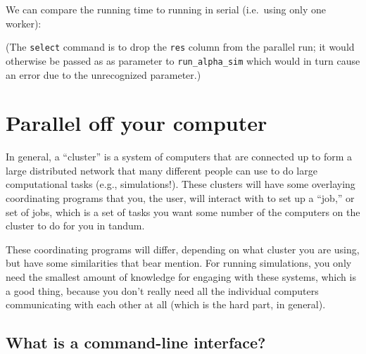 \documentclass[
]{book}
\newenvironment{Shaded}{\begin{snugshade}}{\end{snugshade}}
\newcommand{\AttributeTok}[1]{\textcolor[rgb]{0.77,0.63,0.00}{#1}}
\newcommand{\FunctionTok}[1]{\textcolor[rgb]{0.00,0.00,0.00}{#1}}
\newcommand{\NormalTok}[1]{#1}
\newcommand{\OtherTok}[1]{\textcolor[rgb]{0.56,0.35,0.01}{#1}}
\newcommand{\SpecialCharTok}[1]{\textcolor[rgb]{0.00,0.00,0.00}{#1}}
\begin{document}
We can compare the running time to running in serial (i.e.~using only one worker):

\begin{Shaded}
\end{Shaded}

(The \texttt{select} command is to drop the \texttt{res} column from the parallel run; it would otherwise be passed as as parameter to \texttt{run\_alpha\_sim} which would in turn cause an error due to the unrecognized parameter.)

\hypertarget{parallel-off-your-computer}{%
\section{Parallel off your computer}\label{parallel-off-your-computer}}

In general, a ``cluster'' is a system of computers that are connected up to form a large distributed network that many different people can use to do large computational tasks (e.g., simulations!).
These clusters will have some overlaying coordinating programs that you, the user, will interact with to set up a ``job,'' or set of jobs, which is a set of tasks you want some number of the computers on the cluster to do for you in tandum.

These coordinating programs will differ, depending on what cluster you are using, but have some similarities that bear mention.
For running simulations, you only need the smallest amount of knowledge for engaging with these systems, which is a good thing, because you don't really need all the individual computers communicating with each other at all (which is the hard part, in general).

\hypertarget{what-is-a-command-line-interface}{%
\subsection{What is a command-line interface?}\label{what-is-a-command-line-interface}}
\end{document}
